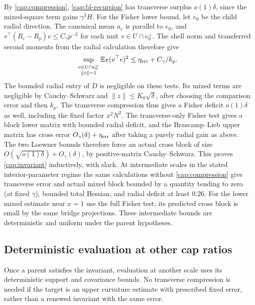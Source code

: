 By \eqref{cap:compression}, \eqref{cap:bl-recursion} has transverse surplus
\(o(1)\delta\), since the mixed-square term gains \(\gamma^3 H\). For the
Fisher lower bound, let \(e_0\) be the child radial direction. The canonical
mean \(a_c\) is parallel to \(e_0\), and
\(v^\top(R_c-R_p)v\le C_\gamma p^{-2}\) for each unit
\(v\in U\cap e_0^\perp\). The shell norm and transferred second moments
from the radial calculation therefore give
\[
 \sup_{\substack{v\in U\cap e_0^\perp\\\|v\|=1}}
       \mathbb E_{\mathsf T}(v^\top e)^2
       \le \eta_{\rm err}+C_\gamma/k_p.
\]
The bounded radial entry of \(D\) is negligible on these tests. Its mixed
terms are negligible by Cauchy--Schwarz and \(\|z\|\le K_0\sqrt\delta\),
after choosing the comparison error and then \(k_p\). The transverse
compression thus gives a Fisher deficit \(o(1)\delta\) as well, including
the fixed factor \(x^2N^2\). The transverse-only Fisher test gives a block lower matrix
with bounded radial deficit, and the Brascamp--Lieb upper matrix has cross
error \(O_\gamma(\delta)+\eta_{\rm err}\) after taking a purely radial gain as
above. The two Loewner bounds therefore force an actual cross block of size
\(O(\sqrt{o(1)\delta})+O_\gamma(\delta)\), by positive-matrix Cauchy--Schwarz.
This proves \eqref{cap:invariant} inductively, with slack. At intermediate
scales in the stated interior-parameter regime the same calculations without
\eqref{cap:compression} give transverse error and actual mixed block bounded
by a quantity tending to zero (at fixed \(\gamma\)), bounded total Hessian,
and radial deficit at least 0.26. For the lower mixed estimate near \(x=1\)
use the full Fisher test; its predicted cross block is small by the same
bridge projections. These intermediate bounds are deterministic and uniform
under the parent hypotheses.

\subsection{Deterministic evaluation at other cap ratios}

Once a parent satisfies the invariant, evaluation at another scale uses
its deterministic support and covariance bounds. No transverse compression
is needed if the target is an upper curvature estimate with prescribed
fixed error, rather than a renewed invariant with the same error.

